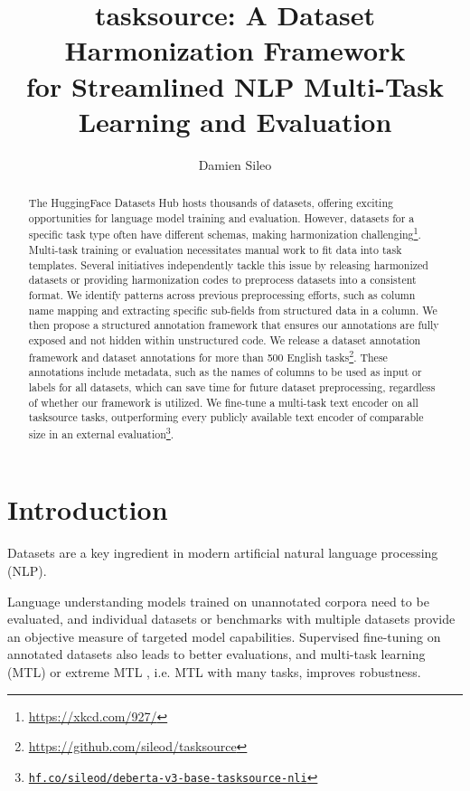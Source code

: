 \documentclass[11pt]{article}
\title{tasksource: A Dataset Harmonization Framework \\
for Streamlined NLP Multi-Task Learning and Evaluation}
\author[1]{Damien Sileo}
\affil[1]{Univ. Lille, Inria, CNRS, Centrale Lille, UMR 9189 - CRIStAL, F-59000 Lille, France}
\affil[ ]{\url{damien.sileo@inria.fr}}
\begin{document}
\maketitle
\begin{abstract}
The HuggingFace Datasets Hub hosts thousands of datasets, offering exciting opportunities for language model training and evaluation. However, datasets for a specific task type often have different schemas, making harmonization challenging\footnote{\url{https://xkcd.com/927/}}. Multi-task training or evaluation necessitates manual work to fit data into task templates. Several initiatives independently tackle this issue by releasing harmonized datasets or providing harmonization codes to preprocess datasets into a consistent format. We identify patterns across previous preprocessing efforts, such as column name mapping and extracting specific sub-fields from structured data in a column. We then propose a structured annotation framework that ensures our annotations are fully exposed and not hidden within unstructured code. We release a dataset annotation framework and dataset annotations for more than 500 English tasks\footnote{\url{https://github.com/sileod/tasksource}}. These annotations include metadata, such as the names of columns to be used as input or labels for all datasets, which can save time for future dataset preprocessing, regardless of whether our framework is utilized. We fine-tune a multi-task text encoder on all tasksource tasks, outperforming every publicly available text encoder of comparable size in an external evaluation\footnote{\href{https://hf.co/sileod/deberta-v3-base-tasksource-nli}{\texttt{hf.co/sileod/deberta-v3-base-tasksource-nli}}}.

\end{abstract}

\section{Introduction}

Datasets are a key ingredient in modern artificial natural language processing (NLP). 

Language understanding models trained on unannotated corpora need to be evaluated, and individual datasets or benchmarks with multiple datasets provide an objective measure of targeted model capabilities. Supervised fine-tuning on annotated datasets also leads to better evaluations, and multi-task learning (MTL) \citep{Caruana1993MultitaskLA} or extreme MTL \citep{aribandi2022ext}, i.e. MTL with many tasks, improves robustness.
\end{document}
